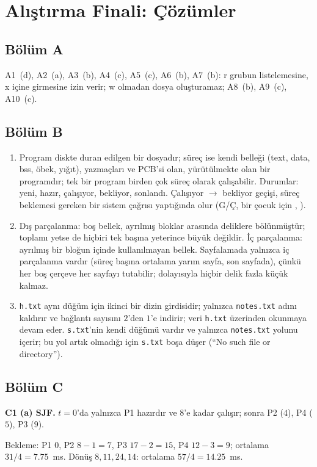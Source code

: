 \section{Alıştırma Finali: Çözümler}
\label{sec:pfsol}

\subsection*{Bölüm A}
A1~(d), A2~(a), A3~(b), A4~(c), A5~(c), A6~(b), A7~(b): r grubun listelemesine, x içine girmesine izin verir; w olmadan dosya oluşturamaz; A8~(b), A9~(c), A10~(c).

\subsection*{Bölüm B}
\begin{enumerate}[leftmargin=1.6em,label=B\arabic*.]
  \item Program diskte duran edilgen bir dosyadır; süreç ise kendi belleği (text, data, bss, öbek, yığıt), yazmaçları ve PCB'si olan, yürütülmekte olan bir programdır; tek bir program birden çok süreç olarak çalışabilir. Durumlar: yeni, hazır, çalışıyor, bekliyor, sonlandı. Çalışıyor $\to$ bekliyor geçişi, süreç beklemesi gereken bir sistem çağrısı yaptığında olur (G/Ç, bir çocuk için , ).
  \item Dış parçalanma: boş bellek, ayrılmış bloklar arasında deliklere bölünmüştür; toplamı yetse de hiçbiri tek başına yeterince büyük değildir. İç parçalanma: ayrılmış bir bloğun içinde kullanılmayan bellek. Sayfalamada yalnızca iç parçalanma vardır (süreç başına ortalama yarım sayfa, son sayfada), çünkü her boş çerçeve her sayfayı tutabilir; dolayısıyla hiçbir delik fazla küçük kalmaz.
  \item \texttt{h.txt} aynı düğüm için ikinci bir dizin girdisidir;  yalnızca \texttt{notes.txt} adını kaldırır ve bağlantı sayısını $2$'den $1$'e indirir; veri \texttt{h.txt} üzerinden okunmaya devam eder. \texttt{s.txt}'nin kendi düğümü vardır ve yalnızca \texttt{notes.txt} yolunu içerir; bu yol artık olmadığı için \texttt{s.txt} boşa düşer (``No such file or directory'').
\end{enumerate}

\subsection*{Bölüm C}
\textbf{C1 (a) SJF.} $t=0$'da yalnızca P1 hazırdır ve $8$'e kadar çalışır; sonra P2 ($4$), P4 ($5$), P3 ($9$).
\begin{center}\end{center}
Bekleme: P1 $0$, P2 $8-1 = 7$, P3 $17-2 = 15$, P4 $12-3 = 9$; ortalama $31/4 = 7.75$~ms. Dönüş $8, 11, 24, 14$: ortalama $57/4 = 14.25$~ms.

